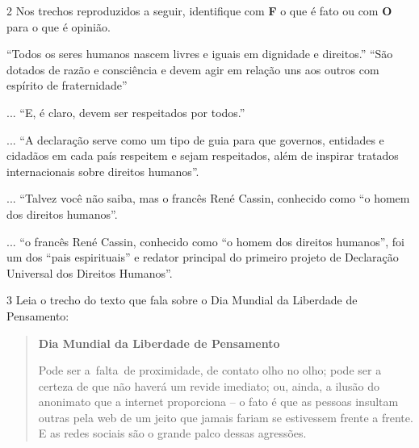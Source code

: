 \begin{escolha}
\begin{escolha}
{\begin{escolha}
\begin{escolha}
\end{escolha}

\num{2} Nos trechos reproduzidos a seguir, identifique com \textbf{F} o que é
fato ou com \textbf{O} para o que é opinião.


\begin{boxlist}
\boxitem[\rosa{F}] ``Todos os seres humanos nascem livres e iguais em dignidade e
direitos.'' ``São dotados de razão e consciência e devem agir em relação
uns aos outros com espírito de fraternidade''

\boxitem[\rosa{O}] ... ``E, é claro, devem ser respeitados por todos.''

\boxitem[\rosa{O}] ... ``A declaração serve como um tipo de guia para que governos,
entidades e cidadãos em cada país respeitem e sejam respeitados, além de
inspirar tratados internacionais sobre direitos humanos''.

\boxitem[\rosa{O}] ... ``Talvez você não saiba, mas o francês René Cassin, conhecido
como ``o homem dos direitos humanos''.

\boxitem[\rosa{F}] ... ``o francês René Cassin, conhecido como ``o homem dos direitos
humanos'', foi um dos ``pais espirituais'' e redator principal do
primeiro projeto de Declaração Universal dos Direitos Humanos''.
\end{boxlist}

\num{3} Leia o trecho do texto que fala sobre o Dia Mundial da Liberdade de Pensamento:

\begin{quote}
\textbf{Dia Mundial da Liberdade de Pensamento}

Pode ser a~falta~de proximidade, de contato olho no olho; pode ser a
certeza de que não haverá um revide imediato; ou, ainda, a ilusão do
anonimato que a internet proporciona -- o fato é que as pessoas insultam
outras pela web de um jeito que jamais fariam se estivessem frente a
frente. E as redes sociais são o grande palco dessas agressões.


\end{quote}
\end{escolha}}
\end{escolha}
\end{escolha}
